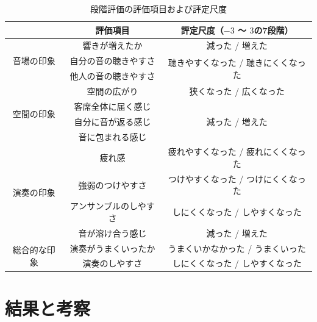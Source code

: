 \documentclass[11pt,a4j]{jreport}
\begin{document}
\begin{table}[H]
  \centering
  \caption{段階評価の評価項目および評定尺度}
  \label{tab:段階評価の評価項目および評定尺度}

  \begingroup
  \renewcommand{\arraystretch}{1.2}
  \begin{tabular}{c|c|c}
    & 評価項目 & 評定尺度（$-3$ 〜 $3$の7段階） \\
    \hline \hline

    \multirow{3}{*}{音場の印象} & 響きが増えたか & 減った / 増えた \\
    \cline{2-3}
    & 自分の音の聴きやすさ & \multirow{2}{*}{聴きやすくなった / 聴きにくくなった}\\
    \cline{2-2}
    & 他人の音の聴きやすさ & \\
    \hline \hline

    \multirow{4}{*}{空間の印象} & 空間の広がり & 狭くなった / 広くなった \\
    \cline{2-3}
    & 客席全体に届く感じ & \multirow{3}{*}{減った / 増えた} \\
    \cline{2-2}
    & 自分に音が返る感じ & \\
    \cline{2-2}
    & 音に包まれる感じ & \\
    \hline \hline

    \multirow{4}{*}{演奏の印象} & 疲れ感 & 疲れやすくなった / 疲れにくくなった \\
    \cline{2-3}
    & 強弱のつけやすさ & つけやすくなった / つけにくくなった \\
    \cline{2-3}
    & アンサンブルのしやすさ & しにくくなった / しやすくなった\\
    \cline{2-3}
    & 音が溶け合う感じ & 減った / 増えた \\
    \hline \hline

    \multirow{2}{*}{総合的な印象} & 演奏がうまくいったか & うまくいかなかった / うまくいった \\
    \cline{2-3}
    & 演奏のしやすさ & しにくくなった / しやすくなった \\
    \hline

  \end{tabular}
  \endgroup
\end{table}

\clearpage
\section{結果と考察}
\end{document}
